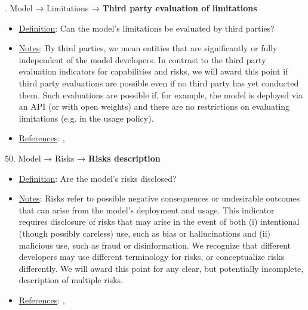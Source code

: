 . Model → Limitations → \textbf{Third party evaluation of limitations}
\vspace{-\parskip}
\begin{itemize}
	\item
	\underline{Definition}: Can the model’s limitations be evaluated by third parties?
	\item
	\underline{Notes}: By third parties, we mean entities that are significantly or fully independent of the model developers. In contrast to the third party evaluation indicators for capabilities and risks, we will award this point if third party evaluations are possible even if no third party has yet conducted them. Such evaluations are possible if, for example, the model is deployed via an API (or with open weights) and there are no restrictions on evaluating limitations (e.g. in the usage policy). 
	\item
	\underline{References}: \citet{raji2022audit}, \citet{liang2022helm}
\end{itemize} \vspace{\baselineskip}


50. Model → Risks → \textbf{Risks description}
\vspace{-\parskip}
\begin{itemize}
	\item
	\underline{Definition}: Are the model's risks disclosed?
	\item
	\underline{Notes}: Risks refer to possible negative consequences or undesirable outcomes that can arise from the model's deployment and usage. This indicator requires disclosure of risks that may arise in the event of both (i) intentional (though possibly careless) use, such as bias or hallucinations and (ii) malicious use, such as fraud or disinformation. We recognize that different developers may use different terminology for risks, or conceptualize risks differently. We will award this point for any clear, but potentially incomplete, description of multiple risks.
	\item
	\underline{References}: \citet{solaiman2023evaluating}, \citet{weidinger2021ethical}
\end{itemize} \vspace{\baselineskip}


